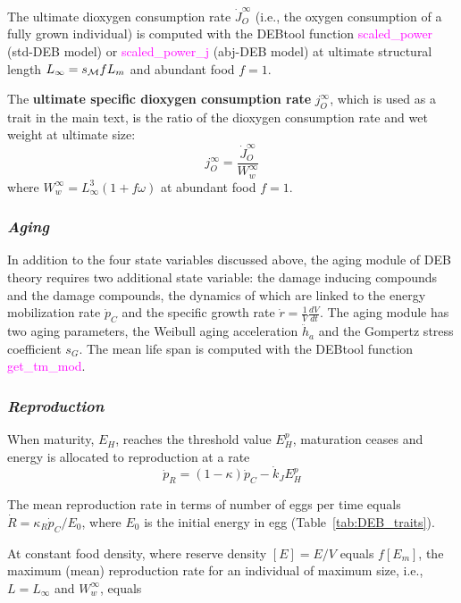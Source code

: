 \documentclass{article}
\begin{document}
The ultimate dioxygen consumption rate $\dot{J}_O^\infty$ (i.e., the oxygen consumption of a fully grown individual) is computed with the DEBtool function \textcolor{magenta}{scaled\_power} (std-DEB model) or \textcolor{magenta}{scaled\_power\_j} (abj-DEB model) at ultimate structural length $L_\infty=s_{\cal M} f L_m$ and abundant food $f=1$.

The {\bf ultimate specific dioxygen consumption rate} $j_O^\infty$, which is used as a trait in the main text, is the ratio of the dioxygen consumption rate  and wet weight at ultimate size: 
\begin{equation}
    j_O^\infty = \frac{\dot{J}_O^\infty}{W_w^\infty}
\end{equation}
where $W_w^\infty = L_\infty^3 (1+f \omega)$ at abundant food  $f=1$.

\subsubsection*{\it Aging}
In addition to the four state variables discussed above, the aging module of DEB theory requires two additional state variable: the damage inducing compounds and the damage compounds, the dynamics of which are linked to the energy mobilization rate $\dot{p}_C$ and the specific growth rate $\dot{r}=\frac{1}{V}\frac{dV}{dt}$. The aging module has two aging parameters, the Weibull aging acceleration $\ddot{h}_a$ and the Gompertz stress coefficient $s_G$. The mean life span is computed with the DEBtool function \textcolor{magenta}{get\_tm\_mod}.

\subsubsection*{\it Reproduction}
When maturity, $E_H$, reaches the threshold value $E_H^p$, maturation ceases and energy is allocated to reproduction at a rate 
\begin{equation}
\dot{p}_R = (1-\kappa)\dot{p}_C - \dot{k}_J E_H^p
\end{equation}

The mean reproduction rate in terms of number of eggs per time equals $\dot{R}= \kappa_R \dot{p}_C/E_0$, where $E_0$ is the initial energy in egg (Table~\ref{tab:DEB_traits}).

At constant food density, where reserve density $[E]=E/V$ equals $f[E_m]$, the maximum (mean) reproduction rate for an individual of maximum size, i.e., $L=L_\infty$ and $W_w^\infty$, equals
\end{document}
